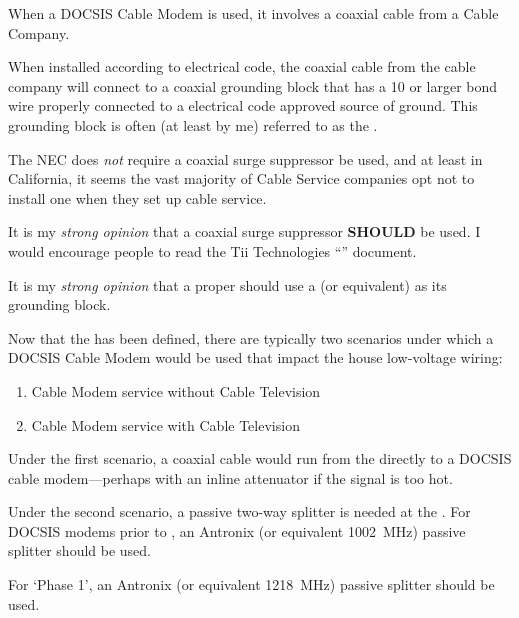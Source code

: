 When a DOCSIS Cable Modem is used, it involves a coaxial cable from a Cable Company.

When installed according to electrical code, the coaxial cable from the cable company will connect to a coaxial
grounding block that has a \SI{10}{\awg} or larger bond wire properly connected to a electrical code
approved source of ground. This grounding block is often (at least by me) referred to as the
.

The NEC does \emph{not} require a coaxial surge suppressor be used, and at least in California, it
seems the vast majority of Cable Service companies opt not to install one when they set up cable service.

It is my \emph{strong opinion} that a coaxial surge suppressor \textbf{SHOULD} be used. I would encourage
people to read the Tii Technologies
``'' document.

It is my \emph{strong opinion} that a proper  should use a
(or equivalent) as its grounding block.

Now that the  has been defined, there are typically two scenarios under
which a DOCSIS Cable Modem would be used that impact the house low-voltage wiring:

\begin{enumerate}
  \item Cable Modem service without Cable Television
  \item Cable Modem service with Cable Television
\end{enumerate}

Under the first scenario, a coaxial cable would run from the  directly to a
DOCSIS cable modem---perhaps with an inline attenuator if the signal is too hot.

Under the second scenario, a passive two-way splitter is needed at the .
For DOCSIS modems prior to , an Antronix
 (or equivalent \SI{1002}{\mega\hertz})
passive splitter should be used.

For  `Phase 1', an Antronix
 (or equivalent \SI{1218}{\mega\hertz})
passive splitter should be used.

